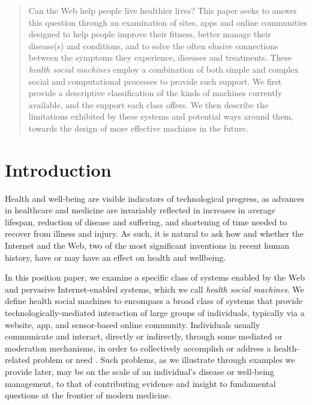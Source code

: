 \documentclass{sig-alternate}
\begin{document}
\maketitle
\begin{abstract}

Can the Web help people live healthier lives?  This paper seeks to
answer this question through an examination of sites, apps and online
communities designed to help people improve their fitness, better
manage their disease(s) and conditions, and to solve the often elusive
connections between the symptoms they experience, diseases and
treatments.  These \emph{health social machines} employ a combination
of both simple and complex social and computational processes to
provide such support.  We first provide a descriptive classification
of the kinds of machines currently available, and the support each
class offers.  We then describe the limitations exhibited by these
systems and potential ways around them, towards the design of more
effective machines in the future.

\end{abstract}




\section{Introduction}

Health and well-being are visible indicators of technological
progress, as advances in healthcare and medicine are invariably
reflected in increases in average lifespan, reduction of disease and
suffering, and shortening of time needed to recover from illness and
injury.  As such, it is natural to ask how and whether the Internet
and the Web, two of the most significant inventions in recent human
history, have or may have an effect on health and wellbeing.

In this position paper, we examine a specific class of systems enabled
by the Web and pervasive Internet-enabled systems, which we call
\emph{health social machines}.  We define health social machines to
encompass a broad class of systems that provide
technologically-mediated interaction of large groups of individuals,
typically via a website, app, and sensor-based online community.
Individuals usually communicate and interact, directly or indirectly,
through some mediated or moderation mechanisms, in order to
collectively accomplish or address a health-related problem or need
\cite{hendler2010semantic}.  Such problems, as we illustrate through
examples we provide later, may be on the scale of an individual's
disease or well-being management, to that of contributing evidence and
insight to fundamental questions at the frontier of modern medicine.
\end{document}
